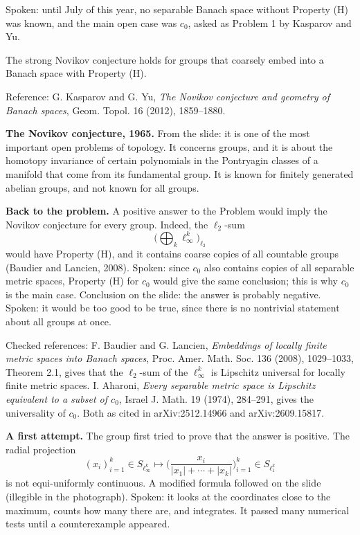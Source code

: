 Spoken: until July of this year, no separable
Banach space without Property (H) was known,
and the main open case was $c_0$, asked as
Problem 1 by Kasparov and Yu.

\begin{theorem}[Kasparov--Yu]
\label{theorem-kasparov-yu}
The strong Novikov conjecture holds for
groups that coarsely embed into a Banach
space with Property (H).
\end{theorem}

\noindent
Reference: G. Kasparov and G. Yu, \emph{The
Novikov conjecture and geometry of Banach
spaces}, Geom. Topol. 16 (2012), 1859--1880.

\medskip\noindent
{\bf The Novikov conjecture, 1965.} From the
slide: it is one of the most important open
problems of topology. It concerns groups, and
it is about the homotopy invariance of
certain polynomials in the Pontryagin classes
of a manifold that come from its fundamental
group. It is known for finitely generated
abelian groups, and not known for all groups.

\medskip\noindent
{\bf Back to the problem.} A positive answer
to the Problem would imply the Novikov
conjecture for every group. Indeed, the
$\ell_2$-sum
$$
\Big(\bigoplus_k \ell_\infty^k\Big)_{\ell_2}
$$
would have Property (H), and it contains
coarse copies of all countable groups
(Baudier and Lancien, 2008). Spoken: since
$c_0$ also contains copies of all separable
metric spaces, Property (H) for $c_0$ would
give the same conclusion; this is why $c_0$
is the main case. Conclusion on the slide:
the answer is probably negative. Spoken: it
would be too good to be true, since there is
no nontrivial statement about all groups at
once.

\begin{remark}
\label{remark-c0-universal-references}
Checked references: F. Baudier and
G. Lancien, \emph{Embeddings of locally
finite metric spaces into Banach spaces},
Proc. Amer. Math. Soc. 136 (2008),
1029--1033, Theorem 2.1, gives that the
$\ell_2$-sum of the $\ell_\infty^k$ is
Lipschitz universal for locally finite metric
spaces. I. Aharoni, \emph{Every separable
metric space is Lipschitz equivalent to a
subset of $c_0$}, Israel J. Math. 19
(1974), 284--291, gives the universality of
$c_0$. Both as cited in arXiv:2512.14966 and
arXiv:2609.15817.
\end{remark}

\medskip\noindent
{\bf A first attempt.} The group first tried
to prove that the answer is positive. The
radial projection
$$
(x_i)_{i=1}^k \in S_{\ell_\infty^k}
\mapsto
\Big(\frac{x_i}{|x_1| + \cdots + |x_k|}
\Big)_{i=1}^k
\in S_{\ell_1^k}
$$
is not equi-uniformly continuous. A modified
formula followed on the slide (illegible in
the photograph). Spoken: it looks at the
coordinates close to the maximum, counts how
many there are, and integrates. It passed
many numerical tests until a counterexample
appeared.

